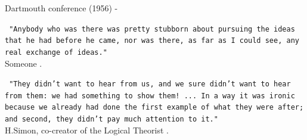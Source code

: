 \begin{frame}[t,allowframebreaks]{Dartmouth conference (1956) -}
    \framebreak

    \begin{blockexample}{} 
        {\tt 
            \scriptsize
            "Anybody who was there was pretty stubborn about pursuing 
            the ideas that he had before he came, nor was there, 
            as far as I could see, any real exchange of ideas."\\
        } 
       \vspace{0.2cm}
        {\scriptsize
             Someone \cite{Dartmouth:1956}.\\
        }
    \end{blockexample}

    \begin{blockexample}{} 
        {\tt 
            \scriptsize
            "They didn't want to hear from us, and we sure didn't want to hear 
            from them: we had something to show them! ... 
            In a way it was ironic because we already had done the first example 
            of what they were after; and second, they didn't pay much attention to it."\\
        } 
       \vspace{0.2cm}
        {\scriptsize
             H.Simon, co-creator of the Logical Theorist \cite{Crevier:1993}.\\
        }
    \end{blockexample}


\end{frame}
